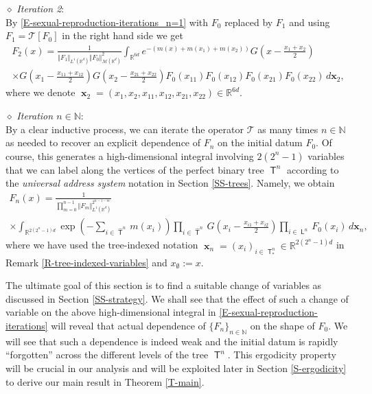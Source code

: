\documentclass[reqno]{amsart}
\DeclareMathOperator{\Tree}{\mathsf{T}}
\DeclareMathOperator{\Leaves}{\mathsf{L}}
\DeclareMathOperator{\bx}{\mathbf{x}}
\numberwithin{equation}{section}
\begin{document}
{\medskip

\noindent $\diamond$ {\em Iteration 2}:\\
By \eqref{E-sexual-reproduction-iterations_n=1} with $F_0$ replaced by $F_1$ and using $F_1=\mathcal{T}[F_0]$ in the right hand side we get
\begin{multline}\label{E-sexual-reproduction-iterations_n=2}
F_2(x)=\frac{1}{\Vert F_1\Vert_{L^1(\mathbb{R}^d)}\Vert F_0\Vert_{\mathcal{M}(\mathbb{R}^d)}^2}\int_{\mathbb{R}^{6d}} e^{-(m(x)+m(x_1)+m(x_2))}G\left(x-\frac{x_1+x_2}{2}\right)\\
\times G\left(x_1-\frac{x_{11}+x_{12}}{2}\right)G\left(x_2-\frac{x_{21}+x_{22}}{2}\right) F_0(x_{11})F_0(x_{12})F_0(x_{21})F_0(x_{22})\,d\mathbf{x}_2,
\end{multline}
where we denote $\bx_2=(x_1,x_2,x_{11},x_{12},x_{21},x_{22})\in \mathbb{R}^{6d}$.

\medskip

\noindent $\diamond$ {\em Iteration $n\in \mathbb{N}$}:\\
By a clear inductive process, we can iterate the operator $\mathcal{T}$ as many times $n\in \mathbb{N}$ as needed to recover an explicit dependence of $F_n$ on the initial datum $F_0$. Of course, this generates a high-dimensional integral involving  $2(2^n-1)$ variables that we can label along the vertices of the perfect binary tree $\Tree^n$ according to the \textit{universal address system} notation in Section \ref{SS-trees}. Namely, we obtain
\begin{multline}\label{E-sexual-reproduction-iterations}
F_n(x)=\frac{1}{\prod_{m=0}^{n-1}\Vert F_m\Vert_{L^1(\mathbb{R}^d)}^{2^{n-1-m}}}\\
\times \int_{\mathbb{R}^{2(2^n-1)d}} \exp\left(-\sum_{i\in \widehat{\Tree}^n}m(x_i)\right)\prod_{i\in \widehat{\Tree}^n} G\left(x_i-\frac{x_{i1}+x_{i2}}{2}\right)\prod_{i\in \Leaves^n}F_0(x_i)\,d\mathbf{x}_n,
\end{multline}
where we have used the tree-indexed notation $\bx_n=(x_i)_{i\in \Tree^n_*}\in \mathbb{R}^{2(2^n-1)d}$ in Remark \ref{R-tree-indexed-variables} and $x_\emptyset:=x$. 

\medskip

The ultimate goal of this section is to find a suitable change of variables as discussed in Section \ref{SS-strategy}. We shall see that the effect of such a change of variable on the above high-dimensional integral in \eqref{E-sexual-reproduction-iterations} will reveal that actual dependence of $\{F_n\}_{n\in \mathbb{N}}$ on the shape of $F_0$. We will see that such a dependence is indeed weak and the initial datum is rapidly ``forgotten'' across the different levels of the tree $\Tree^n$. This ergodicity property will be crucial in our analysis and will be exploited later in Section \ref{S-ergodicity} to derive our main result in Theorem \ref{T-main}.


}
\end{document}
